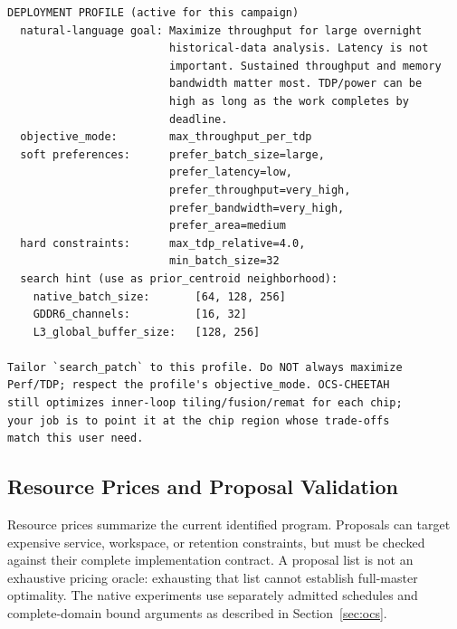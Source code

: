 \begin{tcolorbox}[
    colback=green!6, colframe=green!45!black, title=\textbf{Deployment Profile: \texttt{overnight\_finance\_\allowbreak batch}}, fonttitle=\bfseries, breakable, left=4pt, right=4pt, top=4pt, bottom=4pt ]
\begin{verbatim}
DEPLOYMENT PROFILE (active for this campaign)
  natural-language goal: Maximize throughput for large overnight
                         historical-data analysis. Latency is not
                         important. Sustained throughput and memory
                         bandwidth matter most. TDP/power can be
                         high as long as the work completes by
                         deadline.
  objective_mode:        max_throughput_per_tdp
  soft preferences:      prefer_batch_size=large,
                         prefer_latency=low,
                         prefer_throughput=very_high,
                         prefer_bandwidth=very_high,
                         prefer_area=medium
  hard constraints:      max_tdp_relative=4.0,
                         min_batch_size=32
  search hint (use as prior_centroid neighborhood):
    native_batch_size:       [64, 128, 256]
    GDDR6_channels:          [16, 32]
    L3_global_buffer_size:   [128, 256]

Tailor `search_patch` to this profile. Do NOT always maximize
Perf/TDP; respect the profile's objective_mode. OCS-CHEETAH
still optimizes inner-loop tiling/fusion/remat for each chip;
your job is to point it at the chip region whose trade-offs
match this user need.
\end{verbatim}
\end{tcolorbox}

\subsection{Resource Prices and Proposal Validation}\label{app:llm_duals}
Resource prices summarize the current identified program.
Proposals can target expensive service, workspace, or retention constraints, but must be checked against their complete implementation contract.
A proposal list is not an exhaustive pricing oracle: exhausting that list cannot establish full-master optimality.
The native experiments use separately admitted schedules and complete-domain bound arguments as described in Section~\ref{sec:ocs}.
